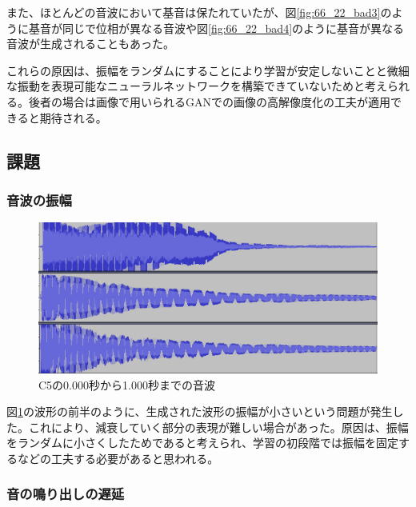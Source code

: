 また、ほとんどの音波において基音は保たれていたが、図\ref{fig:66_22_bad3}のように基音が同じで位相が異なる音波や図\ref{fig:66_22_bad4}のように基音が異なる音波が生成されることもあった。

これらの原因は、振幅をランダムにすることにより学習が安定しないことと微細な振動を表現可能なニューラルネットワークを構築できていないためと考えられる。後者の場合は画像で用いられるGANでの画像の高解像度化の工夫が適用できると期待される。


\subsection{課題}

\subsubsection{音波の振幅}

\begin{figure}[b]
\begin{center}
\includegraphics[width=0.7\hsize]{figure/88_88/c5.png}
\caption{C5の0.000秒から1.000秒までの音波}
\label{fig:88_88_amp}
\end{center}
\end{figure}

図\ref{fig:88_88_amp}の波形の前半のように、生成された波形の振幅が小さいという問題が発生した。これにより、減衰していく部分の表現が難しい場合があった。原因は、振幅をランダムに小さくしたためであると考えられ、学習の初段階では振幅を固定するなどの工夫する必要があると思われる。
    
\subsubsection{音の鳴り出しの遅延}

